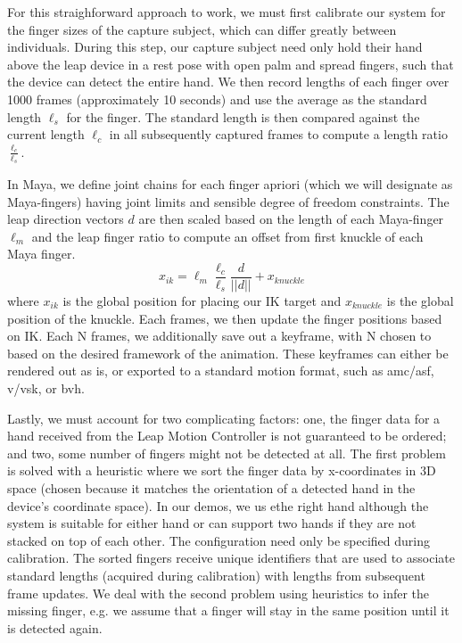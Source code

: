 \documentclass[review]{acmsiggraph}
\begin{document}
For this straighforward approach to work, we must first calibrate our system for 
the finger sizes of the capture subject, which can differ greatly between individuals. 
During this step, our capture subject need only 
hold their hand above the leap device in a rest pose with open palm and spread 
fingers, such that the device can detect the entire hand.  We then record  
lengths of each finger over 1000 frames (approximately 10 seconds) and use the average 
as the standard length $\ell_s$ for the finger. The standard length is then compared against the 
current length $\ell_c$ in all subsequently captured frames to compute a length ratio $\frac{\ell_c}{\ell_s}$.

In Maya, we define joint chains for each finger apriori (which we will designate 
as Maya-fingers)  having joint limits and sensible degree of freedom constraints. The leap direction 
vectors $d$ are then scaled based on the length of each Maya-finger $\ell_m$ and the leap finger ratio to 
compute an offset from first knuckle of each Maya finger. 
\[
x_{ik} = \ell_m \frac{\ell_c}{\ell_s} \frac{d}{||d||} + x_{knuckle}
\]
where $x_{ik}$ is the global position for placing our IK target and $x_{knuckle}$ is the global 
position of the knuckle. Each frames, we then update the finger positions based on IK. Each N frames, 
we additionally save out a keyframe, with N chosen to based on the desired framework of the animation.
These keyframes can either be rendered out as is, or exported to a 
standard motion format, such as amc/asf, v/vsk, or bvh.

Lastly, we must account for two complicating factors: one, the finger data for a hand 
received from the Leap Motion Controller is not guaranteed to be ordered; and two, some 
number of fingers might not be detected at all. The first problem is solved with a heuristic where 
we sort the finger data by x-coordinates in 3D space (chosen because it matches the orientation of a detected
hand in the device's coordinate space). In our demos, we us ethe right hand although the system is 
suitable for either hand or can support two hands if they are not stacked on top of each other.
The configuration need only be specified during calibration. 
The sorted fingers receive unique identifiers that are used to associate  
 standard lengths (acquired during calibration) with lengths from subsequent frame updates. 
We deal with the second problem using heuristics to infer the missing finger, e.g. 
we assume that a finger will stay in the same position until it is detected again.
\end{document}
